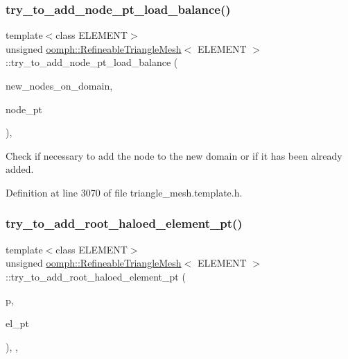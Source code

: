 \subsubsection{\texorpdfstring{try\+\_\+to\+\_\+add\+\_\+node\+\_\+pt\+\_\+load\+\_\+balance()}{try\_to\_add\_node\_pt\_load\_balance()}}
{\footnotesize\ttfamily template$<$class E\+L\+E\+M\+E\+NT$>$ \\
unsigned \hyperlink{classoomph_1_1RefineableTriangleMesh}{oomph\+::\+Refineable\+Triangle\+Mesh}$<$ E\+L\+E\+M\+E\+NT $>$\+::try\+\_\+to\+\_\+add\+\_\+node\+\_\+pt\+\_\+load\+\_\+balance (\begin{DoxyParamCaption}\item[{\hyperlink{classoomph_1_1Vector}{Vector}$<$ \hyperlink{classoomph_1_1Node}{Node} $\ast$$>$ \&}]{new\+\_\+nodes\+\_\+on\+\_\+domain,  }\item[{\hyperlink{classoomph_1_1Node}{Node} $\ast$\&}]{node\+\_\+pt }\end{DoxyParamCaption})\hspace{0.3cm}{\ttfamily [inline]}, {\ttfamily [protected]}}



Check if necessary to add the node to the new domain or if it has been already added. 



Definition at line 3070 of file triangle\+\_\+mesh.\+template.\+h.

\mbox{\label{classoomph_1_1RefineableTriangleMesh_a40ed8992d60508600cb3f3d0b9fb2c46}} 
\subsubsection{\texorpdfstring{try\+\_\+to\+\_\+add\+\_\+root\+\_\+haloed\+\_\+element\+\_\+pt()}{try\_to\_add\_root\_haloed\_element\_pt()}}
{\footnotesize\ttfamily template$<$class E\+L\+E\+M\+E\+NT$>$ \\
unsigned \hyperlink{classoomph_1_1RefineableTriangleMesh}{oomph\+::\+Refineable\+Triangle\+Mesh}$<$ E\+L\+E\+M\+E\+NT $>$\+::try\+\_\+to\+\_\+add\+\_\+root\+\_\+haloed\+\_\+element\+\_\+pt (\begin{DoxyParamCaption}\item[{const unsigned \&}]{p,  }\item[{\hyperlink{classoomph_1_1GeneralisedElement}{Generalised\+Element} $\ast$\&}]{el\+\_\+pt }\end{DoxyParamCaption})\hspace{0.3cm}{\ttfamily [inline]}, {\ttfamily [protected]}, {\ttfamily [virtual]}}



